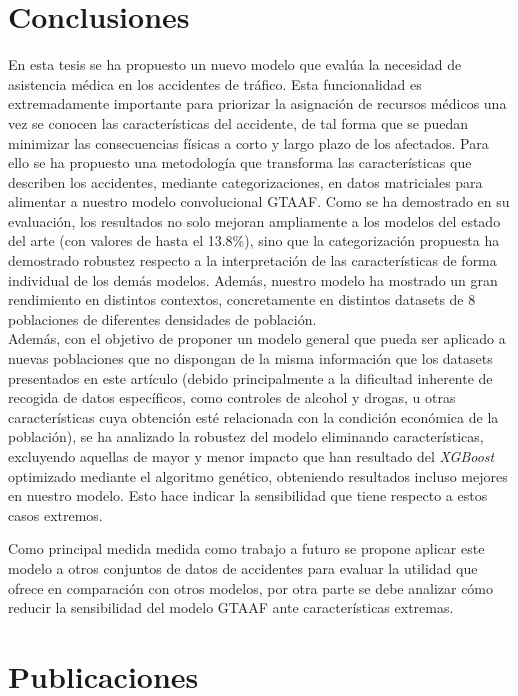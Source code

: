 \documentclass{uathesis-es}
\begin{document}
{\chapter{Conclusiones}


En esta tesis se ha propuesto un nuevo modelo que evalúa la necesidad de asistencia médica en los accidentes de tráfico. Esta funcionalidad es extremadamente importante para priorizar la asignación de recursos médicos una vez se conocen las características del accidente, de tal forma que se puedan minimizar las consecuencias físicas a corto y largo plazo de los afectados. Para ello se ha propuesto una metodología que transforma las características que describen los accidentes, mediante categorizaciones, en datos matriciales para alimentar a nuestro modelo convolucional GTAAF. Como se ha demostrado en su evaluación, los resultados no solo mejoran ampliamente a los modelos del estado del arte (con valores de hasta el 13.8\%), sino que la categorización propuesta ha demostrado robustez respecto a la interpretación de las características de forma individual de los demás modelos. Además, nuestro modelo ha mostrado un gran rendimiento en distintos contextos, concretamente en  distintos datasets de 8 poblaciones de diferentes densidades de población.\\

Además, con el objetivo de proponer un modelo general que pueda ser aplicado a nuevas poblaciones que no dispongan de la misma información que los datasets presentados en este artículo (debido principalmente a la dificultad inherente de recogida de datos específicos, como controles de alcohol y drogas, u otras características cuya obtención esté relacionada con la condición económica de la población), se ha analizado la robustez del modelo eliminando características, excluyendo aquellas de mayor y menor impacto que han resultado del \textit{XGBoost} optimizado mediante el algoritmo genético, obteniendo resultados incluso mejores en nuestro modelo. Esto hace indicar la sensibilidad que tiene respecto a estos casos extremos.

Como principal medida medida como trabajo a futuro se propone aplicar este modelo a otros conjuntos de datos de accidentes para evaluar la utilidad que ofrece en comparación con otros modelos, por otra parte se debe analizar cómo reducir la sensibilidad del modelo GTAAF ante características extremas.

\chapter{Publicaciones}

}
\end{document}
